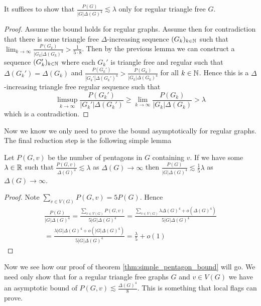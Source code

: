 \begin{corollary}
    \label{corollary:pentagon_regular_suffices}
    It suffices to show that $\frac{P(G)}{|G|\Delta(G)^4} \lesssim \lambda$
    only for regular triangle free $G$.
\end{corollary}

\begin{proof}
    Assume the bound holds for regular graphs.
    Assume then for contradiction that
    there is some triangle free $\Delta$-increasing sequence $(G_k)_{k\in\mathbb{N}}$
    such that $\lim_{k\to\infty} \frac{P(G_k)}{|G_k|\Delta(G_k)^4} > \frac{1}{5\cdot 8}$.
    Then by the previous lemma we can construct a sequence
    $(G_k')_{k\in\mathbb{N}}$ where each $G_k'$ is triangle free and regular
    such that $\Delta(G_k')=\Delta(G_k)$ and
    $\frac{P(G_k')}{|G_k'|\Delta(G_k')^4} >\frac{P(G_k)}{|G_k|\Delta(G_k)^4}$
    for all $k\in\mathbb{N}$. Hence this is a $\Delta$-increasing triangle free regular
    sequence such that
    \[
        \limsup_{k\to\infty} \frac{P(G_k')}{|G_k'|\Delta(G_k')}
        \geq
        \lim_{k\to\infty} \frac{P(G_k)}{|G_k|\Delta(G_k)}
        > \lambda
    \]
    which is a contradiction.
\end{proof}

Now we know we only need to prove the bound asymptotically for regular graphs.
The final reduction step is the following simple lemma
\begin{lemma}
    \label{lemma:pentagon_local_count}
    Let $P(G, v)$ be the number of pentagons in $G$ containing $v$. If we have some
    $\lambda \in \mathbb{R}$ such that
    $\frac{P(G, v)}{\Delta(G)^4} \lesssim \lambda$ as $\Delta(G)\to\infty$
    then
    $\frac{P(G)}{|G|\Delta(G)^4} \lesssim \frac{1}{5}\lambda$ as $\Delta(G)\to\infty$.
\end{lemma}

\begin{proof}
    Note $\sum_{v\in V(G)}P(G, v) = 5P(G)$. Hence
    \begin{multline*}
        \frac{P(G)}{|G|\Delta(G)^4}
        = \frac{\sum_{v\in V(G)} P(G, v)}{5|G|\Delta(G)^4}
        = \frac{\sum_{v \in V(G)} \lambda\Delta(G)^4 + o(\Delta(G)^4)}{5|G|\Delta(G)^4}\\
        = \frac{\lambda|G|\Delta(G)^4 + o(|G|\Delta(G)^4)}{5|G|\Delta(G)^4}
        = \frac{\lambda}{5} + o(1)
    \end{multline*}
\end{proof}

Now we see how our proof of theorem \ref{thm:simple_pentagon_bound} will go.
We need only show that for a regular triangle free graphs $G$ and
$v\in V(G)$ we have an asymptotic bound of $P(G, v) \lesssim \frac{\Delta(G)^4}{8}$.
This is something that local flags can prove.

